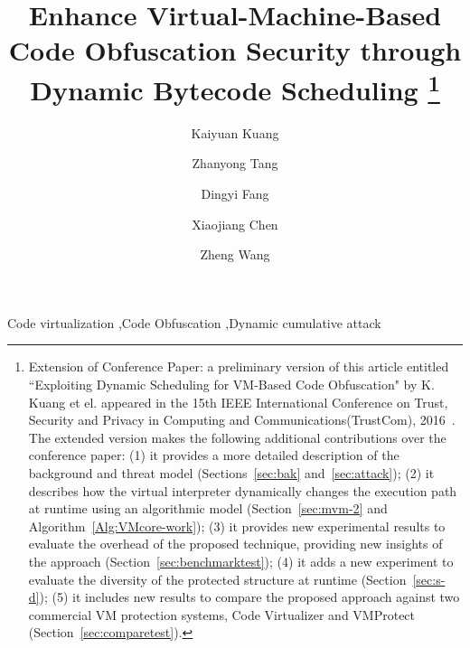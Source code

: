 \documentclass[preprint,12pt,3p]{elsarticle}
\begin{document}
\begin{frontmatter}

\title{
Enhance Virtual-Machine-Based Code Obfuscation Security through Dynamic Bytecode Scheduling
\footnote{
Extension of Conference Paper: a preliminary version of this article entitled ``Exploiting Dynamic Scheduling for
VM-Based Code Obfuscation" by K. Kuang et el. appeared in the 15th IEEE International Conference on Trust, Security and
Privacy in Computing and Communications(TrustCom), 2016~\cite{kuang2016exploiting}. The extended version makes the
following additional contributions over the conference paper: (1) it provides a more detailed description of the
background and threat model (Sections~\ref{sec:bak} and~\ref{sec:attack}); (2) it describes how the virtual interpreter
dynamically changes the execution path at runtime using an algorithmic model (Section~\ref{sec:mvm-2} and
Algorithm~\ref{Alg:VMcore-work}); (3) it provides new experimental results to evaluate the overhead of the proposed
technique, providing new insights of the approach (Section~\ref{sec:benchmarktest}); (4) it adds a new experiment to
evaluate the diversity of the protected structure at runtime (Section~\ref{sec:s-d}); (5) it includes new results to
compare the proposed approach against two
commercial VM protection systems, Code Virtualizer and VMProtect (Section~\ref{sec:comparetest}).
}
}

\author[label1]{Kaiyuan Kuang}
\address[label1]{School of Information Science and Technology, Northwest University, China.}
\address[label2]{School of Computing and Communications, Lancaster University, UK}%




\author[label1]{Zhanyong Tang}

\author[label1]{Dingyi Fang}

\author[label1]{Xiaojiang Chen}

\author[label2]{Zheng Wang}



\begin{keyword}
Code virtualization \sep Code Obfuscation \sep Dynamic cumulative attack
\end{keyword}

\end{frontmatter}
\end{document}
